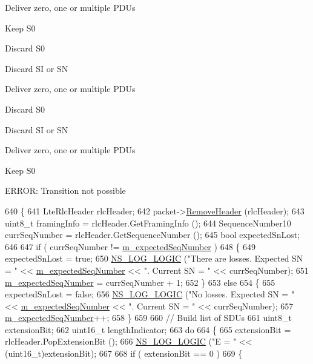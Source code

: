 Deliver zero, one or multiple P\+D\+Us

Keep S0

Discard S0

Discard SI or SN

Deliver zero, one or multiple P\+D\+Us

Discard S0

Discard SI or SN

Deliver zero, one or multiple P\+D\+Us

Keep S0

E\+R\+R\+OR\+: Transition not possible
\begin{DoxyCode}
640 \{
641   LteRlcHeader rlcHeader;
642   packet->\hyperlink{classns3_1_1Packet_a0961eccf975d75f902d40956c93ba63e}{RemoveHeader} (rlcHeader);
643   uint8\_t framingInfo = rlcHeader.GetFramingInfo ();
644   SequenceNumber10 currSeqNumber = rlcHeader.GetSequenceNumber ();
645   \textcolor{keywordtype}{bool} expectedSnLost;
646 
647   \textcolor{keywordflow}{if} ( currSeqNumber != \hyperlink{classns3_1_1LteRlcUm_a55c7d22f64cc0dcebab7caf96dbac1e3}{m\_expectedSeqNumber} )
648     \{
649       expectedSnLost = \textcolor{keyword}{true};
650       \hyperlink{group__logging_ga88acd260151caf2db9c0fc84997f45ce}{NS\_LOG\_LOGIC} (\textcolor{stringliteral}{"There are losses. Expected SN = "} << 
      \hyperlink{classns3_1_1LteRlcUm_a55c7d22f64cc0dcebab7caf96dbac1e3}{m\_expectedSeqNumber} << \textcolor{stringliteral}{". Current SN = "} << currSeqNumber);
651       \hyperlink{classns3_1_1LteRlcUm_a55c7d22f64cc0dcebab7caf96dbac1e3}{m\_expectedSeqNumber} = currSeqNumber + 1;
652     \}
653   \textcolor{keywordflow}{else}
654     \{
655       expectedSnLost = \textcolor{keyword}{false};
656       \hyperlink{group__logging_ga88acd260151caf2db9c0fc84997f45ce}{NS\_LOG\_LOGIC} (\textcolor{stringliteral}{"No losses. Expected SN = "} << 
      \hyperlink{classns3_1_1LteRlcUm_a55c7d22f64cc0dcebab7caf96dbac1e3}{m\_expectedSeqNumber} << \textcolor{stringliteral}{". Current SN = "} << currSeqNumber);
657       \hyperlink{classns3_1_1LteRlcUm_a55c7d22f64cc0dcebab7caf96dbac1e3}{m\_expectedSeqNumber}++;
658     \}
659 
660   \textcolor{comment}{// Build list of SDUs}
661   uint8\_t extensionBit;
662   uint16\_t lengthIndicator;
663   \textcolor{keywordflow}{do}
664     \{
665       extensionBit = rlcHeader.PopExtensionBit ();
666       \hyperlink{group__logging_ga88acd260151caf2db9c0fc84997f45ce}{NS\_LOG\_LOGIC} (\textcolor{stringliteral}{"E = "} << (uint16\_t)extensionBit);
667 
668       \textcolor{keywordflow}{if} ( extensionBit == 0 )
669         \{

\end{DoxyCode}
